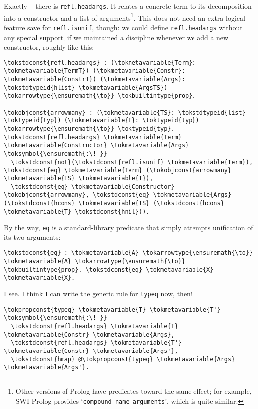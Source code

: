\heroADVISOR{} Exactly -- there is \texttt{refl.headargs}. It relates a
concrete term to its decomposition into a constructor and a list of
arguments\footnote{Other versions of Prolog have predicates toward the same effect; for example, SWI-Prolog \citep{wielemaker2012swi} provides `\texttt{compound\_{}name\_{}arguments}', which is quite similar.}.
This does not need an extra-logical feature save for
\texttt{refl.isunif}, though: we could define \texttt{refl.headargs}
without any special support, if we maintained a discipline whenever we
add a new constructor, roughly like this:

\begin{verbatim}
\tokstdconst{refl.headargs} : (\tokmetavariable{Term}: \tokmetavariable{TermT}) (\tokmetavariable{Constr}: \tokmetavariable{ConstrT}) (\tokmetavariable{Args}: \tokstdtypeid{hlist} \tokmetavariable{ArgsTS}) \tokarrowtype{\ensuremath{\to}} \tokbuiltintype{prop}.

\tokobjconst{arrowmany} : (\tokmetavariable{TS}: \tokstdtypeid{list} \toktypeid{typ}) (\tokmetavariable{T}: \toktypeid{typ}) \tokarrowtype{\ensuremath{\to}} \toktypeid{typ}.
\tokstdconst{refl.headargs} \tokmetavariable{Term} \tokmetavariable{Constructor} \tokmetavariable{Args} \toksymbol{\ensuremath{:\!-}}
  \tokstdconst{not}(\tokstdconst{refl.isunif} \tokmetavariable{Term}), \tokstdconst{eq} \tokmetavariable{Term} (\tokobjconst{arrowmany} \tokmetavariable{TS} \tokmetavariable{T}),
  \tokstdconst{eq} \tokmetavariable{Constructor} \tokobjconst{arrowmany}, \tokstdconst{eq} \tokmetavariable{Args} (\tokstdconst{hcons} \tokmetavariable{TS} (\tokstdconst{hcons} \tokmetavariable{T} \tokstdconst{hnil})).
\end{verbatim}

By the way, \texttt{eq} is a standard-library predicate that simply
attempts unification of its two arguments:

\begin{verbatim}
\tokstdconst{eq} : \tokmetavariable{A} \tokarrowtype{\ensuremath{\to}} \tokmetavariable{A} \tokarrowtype{\ensuremath{\to}} \tokbuiltintype{prop}. \tokstdconst{eq} \tokmetavariable{X} \tokmetavariable{X}.
\end{verbatim}

\heroSTUDENT{} I see. I think I can write the generic rule for \texttt{typeq}
now, then!

\begin{verbatim}
\tokpropconst{typeq} \tokmetavariable{T} \tokmetavariable{T'} \toksymbol{\ensuremath{:\!-}}
  \tokstdconst{refl.headargs} \tokmetavariable{T} \tokmetavariable{Constr} \tokmetavariable{Args},
  \tokstdconst{refl.headargs} \tokmetavariable{T'} \tokmetavariable{Constr} \tokmetavariable{Args'},
  \tokstdconst{hmap} @\tokpropconst{typeq} \tokmetavariable{Args} \tokmetavariable{Args'}.
\end{verbatim}

